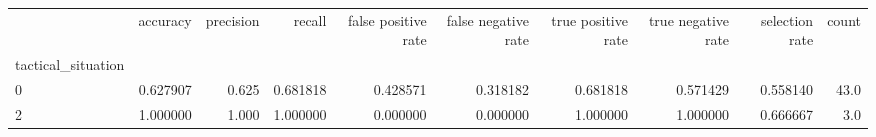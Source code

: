 \begin{tabular}{lrrrrrrrrr}
\toprule
{} &  accuracy &  precision &    recall &  false positive rate &  false negative rate &  true positive rate &  true negative rate &  selection rate &  count \\
tactical\_situation &           &            &           &                      &                      &                     &                     &                 &        \\
\midrule
0                  &  0.627907 &      0.625 &  0.681818 &             0.428571 &             0.318182 &            0.681818 &            0.571429 &        0.558140 &   43.0 \\
2                  &  1.000000 &      1.000 &  1.000000 &             0.000000 &             0.000000 &            1.000000 &            1.000000 &        0.666667 &    3.0 \\
\bottomrule
\end{tabular}
